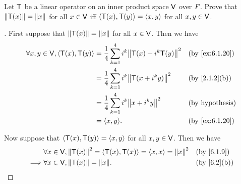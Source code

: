 \begin{ex}\label{ex:6.3.10}
  Let \(\mathsf{T}\) be a linear operator on an inner product space \(\mathsf{V}\) over \(\mathit{F}\).
  Prove that \(\left\lVert\mathsf{T}(x)\right\rVert = \left\lVert x\right\rVert\) for all \(x \in \mathsf{V}\) iff \(\left\langle\mathsf{T}(x), \mathsf{T}(y)\right\rangle = \left\langle x,y\right\rangle\) for all \(x, y \in \mathsf{V}\).
\end{ex}

\begin{proof}[]
  First suppose that \(\left\lVert\mathsf{T}(x)\right\rVert = \left\lVert x\right\rVert\) for all \(x \in \mathsf{V}\).
  Then we have
  \begin{align*}
    \forall x, y \in \V, \inn{\T(x), \T(y)} & = \frac{1}{4} \sum_{k = 1}^4 i^k \norm{\T(x) + i^k \T(y)}^2 &  & \text{(by \cref{ex:6.1.20})} \\
                                            & = \frac{1}{4} \sum_{k = 1}^4 i^k \norm{\T(x + i^k y)}^2     &  & \text{(by \cref{2.1.2}(b))}  \\
                                            & = \frac{1}{4} \sum_{k = 1}^4 i^k \norm{x + i^k y}^2         &  & \text{(by hypothesis)}       \\
                                            & = \inn{x, y}.                                               &  & \text{(by \cref{ex:6.1.20})}
  \end{align*}

  Now suppose that \(\left\langle\mathsf{T}(x), \mathsf{T}(y)\right\rangle = \left\langle x, y\right\rangle\) for all \(x, y \in \mathsf{V}\).
  Then we have
  \begin{align*}
             & \forall x \in \V, \norm{\T(x)}^2 = \inn{\T(x), \T(x)} = \inn{x, x} = \norm{x}^2 &  & \text{(by \cref{6.1.9})}  \\
    \implies & \forall x \in \V, \norm{\T(x)} = \norm{x}.                                      &  & \text{(by \cref{6.2}(b))}
  \end{align*}
\end{proof}

\begin{ex}\label{ex:6.3.12}

\end{ex}

\begin{ex}\label{ex:6.3.19}

\end{ex}

\begin{ex}\label{ex:6.3.24}

\end{ex}
